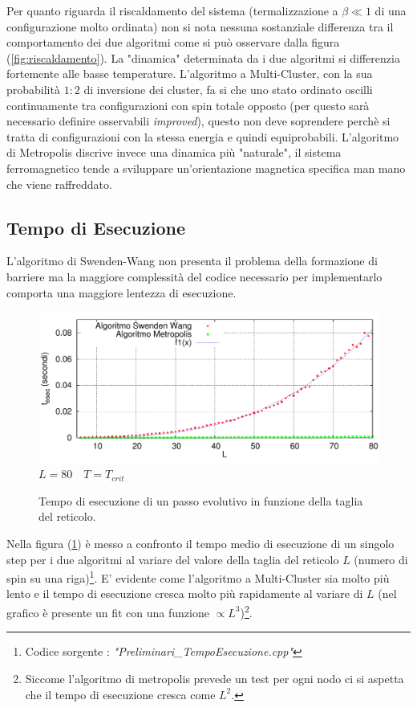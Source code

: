 \newline Per quanto riguarda il riscaldamento del sistema (termalizzazione a $\beta\ll1$ di una configurazione molto ordinata) non si nota nessuna sostanziale differenza tra il comportamento dei due algoritmi come si può osservare dalla figura (\ref{fig:riscaldamento}).
\bigskip \newline 
La "dinamica" determinata da i due algoritmi si differenzia fortemente alle basse temperature. 
L'algoritmo a Multi-Cluster, con la sua probabilità $1:2$ di inversione dei cluster, fa si che uno stato ordinato oscilli continuamente tra configurazioni con spin totale opposto (per questo sarà necessario definire osservabili \emph{improved}), questo non deve soprendere perchè si tratta di configurazioni con la stessa energia e quindi equiprobabili.
L'algoritmo di Metropolis discrive invece una dinamica più "naturale", il sistema ferromagnetico tende a sviluppare un'orientazione magnetica specifica man mano che viene raffreddato.


\subsection{Tempo di Esecuzione}
L'algoritmo di Swenden-Wang non presenta il problema della formazione di barriere ma la maggiore complessità del codice necessario per implementarlo comporta una maggiore lentezza di esecuzione.
     \begin {figure}[h!]
      \begin{center}
		\caption[Preliminari$\_$TempoEsecuzione.cpp]{Tempo di esecuzione di un passo evolutivo in funzione della taglia del reticolo.}\label{fig:t_esec}
        \includegraphics[scale=0.65,]{Immagini/ParteB/TempoEsecuzione}
		\newline \footnotesize  $L = 80\quad T=T_{crit}$
      \end{center}
    \end {figure} 
Nella figura (\ref{fig:t_esec}) è messo a confronto il tempo medio di esecuzione di un singolo step per i due algoritmi al variare del valore della taglia del reticolo $L$ (numero di spin su una riga)\footnote{Codice sorgente : \emph{"Preliminari\_TempoEsecuzione.cpp"}}.
E' evidente come l'algoritmo a Multi-Cluster sia molto più lento e il tempo di esecuzione cresca molto più rapidamente al variare di $L$ (nel grafico è presente un fit con una funzione $\propto L^3$)\footnote{Siccome l'algoritmo di metropolis prevede un test per ogni nodo ci si aspetta che il tempo di esecuzione cresca come $L^2$.}.


